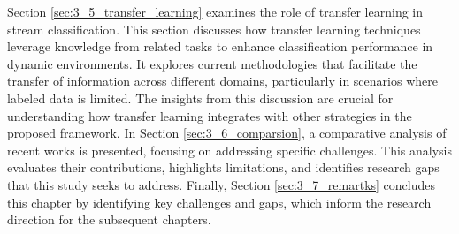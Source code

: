 Section \ref{sec:3_5_transfer_learning} examines the role of transfer learning in stream classification. This section discusses how transfer learning techniques leverage knowledge from related tasks to enhance classification performance in dynamic environments. It explores current methodologies that facilitate the transfer of information across different domains, particularly in scenarios where labeled data is limited. The insights from this discussion are crucial for understanding how transfer learning integrates with other strategies in the proposed framework. In Section \ref{sec:3_6_comparsion}, a comparative analysis of recent works is presented, focusing on addressing specific challenges. This analysis evaluates their contributions, highlights limitations, and identifies research gaps that this study seeks to address. Finally, Section \ref{sec:3_7_remartks} concludes this chapter by identifying key challenges and gaps, which inform the research direction for the subsequent chapters.



